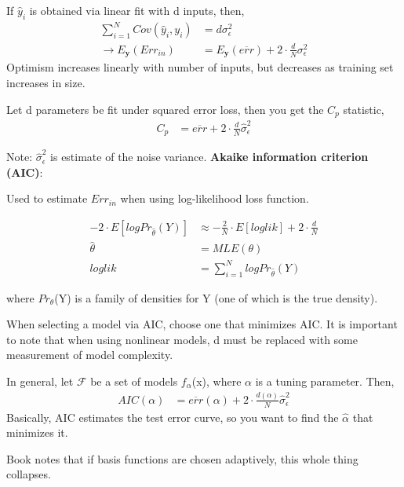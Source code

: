 \documentclass[11pt]{labbook}
\begin{document}
If $\hat{y}_i$ is obtained via linear fit with d inputs, then,
\begin{align*}
\sum_{i=1}^{N}Cov\left(\hat{y}_i,y_i\right) &= d\sigma_{\epsilon}^{2} \\
\rightarrow  E_{\textbf{y}}(Err_{in}) &= E_{\textbf{y}}(\overline{err}) + 2 \cdot \frac{d}{N}\sigma_{\epsilon}^{2}
\end{align*}
Optimism increases linearly with number of inputs, but decreases as training set increases in size. 

Let d parameters be fit under squared error loss, then you get the $C_p$ statistic,
\begin{align*}
C_p &= \overline{err} + 2 \cdot \frac{d}{N}\hat{\sigma}_{\epsilon}^{2}
\end{align*}

Note: $\hat{\sigma}_{\epsilon}^{2}$ is estimate of the noise variance.
\newline
\newline
\textbf{Akaike information criterion (AIC)}:\newline

Used to estimate $Err_{in}$ when using log-likelihood loss function. 

\begin{align*}
-2 \cdot E\left[logPr_{\hat{\theta}}(Y)\right] &\approx -\frac{2}{N} \cdot E\left[loglik\right] + 2 \cdot \frac{d}{N} \\
\hat{\theta} &= MLE(\theta) \\
loglik &= \sum_{i=1}^{N}logPr_{\hat{\theta}}(Y)
\end{align*}

where $Pr_{\theta}$(Y) is a family of densities for Y (one of which is the true density).

When selecting a model via AIC, choose one that minimizes AIC. It is important to note that when using nonlinear models, d must be replaced with some measurement of model complexity. 

In general, let $\mathcal{F}$ be a set of models $f_{\alpha}$(x), where $\alpha$ is a tuning parameter. Then,
\begin{align*}
AIC(\alpha) &= \overline{err}(\alpha) + 2 \cdot \frac{d(\alpha)}{N}\hat{\sigma}_{\epsilon}^2
\end{align*}
Basically, AIC estimates the test error curve, so you want to find the $\hat{\alpha}$ that minimizes it. 

Book notes that if basis functions are chosen adaptively, this whole thing collapses. 
\newline
\end{document}
